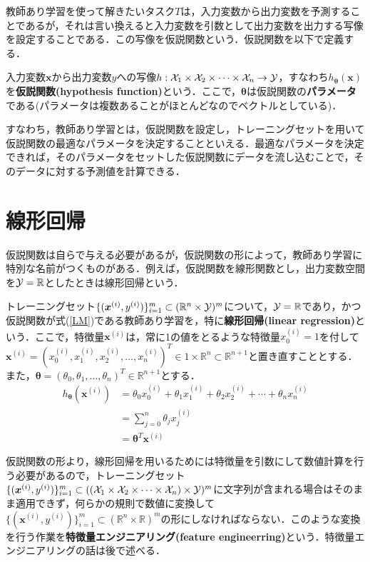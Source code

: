 教師あり学習を使って解きたいタスク$T$は，入力変数から出力変数を予測することであるが，それは言い換えると入力変数を引数として出力変数を出力する写像を設定することである．この写像を仮説関数という．仮説関数を以下で定義する．

\begin{defi}[仮説関数]
入力変数${\bm x}$から出力変数$y$への写像$h:{\cal X}_1 \times {\cal X}_2\times \cdots \times{\cal X}_n \to {\cal Y}$，すなわち$h_{\bm \theta}({\bm x})$を{\bf 仮説関数(hypothesis function)}という．ここで，${\bm \theta}$は仮説関数の{\bf パラメータ}である(パラメータは複数あることがほとんどなのでベクトルとしている)．
\end{defi}

すなわち，教師あり学習とは，仮説関数を設定し，トレーニングセットを用いて仮説関数の最適なパラメータを決定することといえる．最適なパラメータを決定できれば，そのパラメータをセットした仮説関数にデータを流し込むことで，そのデータに対する予測値を計算できる．

\section{線形回帰}

仮説関数は自らで与える必要があるが，仮説関数の形によって，教師あり学習に特別な名前がつくものがある．例えば，仮説関数を線形関数とし，出力変数空間を${\cal Y}=\mathbb{R}$としたときは線形回帰という．

\begin{defi}[線形回帰]
トレーニングセット$\{({\bm x}^{(i)},y^{(i)})\}_{i=1}^m \subset (\mathbb{R}^n \times {\cal Y})^m$について，${\cal Y}=\mathbb{R}$であり，かつ仮説関数が式(\ref{LM})である教師あり学習を，特に{\bf 線形回帰(linear regression)}という．ここで，特徴量${\bm x}^{(i)}$は，常に1の値をとるような特徴量$x_0^{(i)}=1$を付して${\bm x}^{(i)}=(x_0^{(i)},x_1^{(i)},x_2^{(i)},\ldots,x_n^{(i)})^T \in 1 \times \mathbb{R}^n \subset \mathbb{R}^{n+1}$と置き直すこととする．また，${\bm \theta}=(\theta_0,\theta_1,\ldots,\theta_n)^T \in \mathbb{R}^{n+1}$とする．
\begin{align}
h_{{\bm \theta}}({\bm x}^{(i)}) &= \theta_0 x_0^{(i)}+\theta_1 x_1^{(i)} +\theta_2 x_2^{(i)}+\cdots + \theta_n x_n^{(i)} \nonumber \\
&= \sum_{j=0}^n \theta_j x_j^{(i)}\nonumber \\
&= {\bm \theta}^T {\bm x}^{(i)} \label{LM}
\end{align}
\end{defi}

\begin{rem}
仮説関数の形より，線形回帰を用いるためには特徴量を引数にして数値計算を行う必要があるので，トレーニングセット$\{(\bm{x}^{(i)},y^{(i)})\}_{i=1}^m \subset (({\cal X}_1 \times {\cal X}_2\times \cdots \times{\cal X}_n) \times {\cal Y})^m$に文字列が含まれる場合はそのまま適用できず，何らかの規則で数値に変換して$\{(\bm{x}^{(i)},y^{(i)})\}_{i=1}^m \subset (\mathbb{R}^n \times \mathbb{R})^m$の形にしなければならない．このような変換を行う作業を{\bf 特徴量エンジニアリング(feature engineerring)}という．特徴量エンジニアリングの話は後で述べる．
\end{rem}


